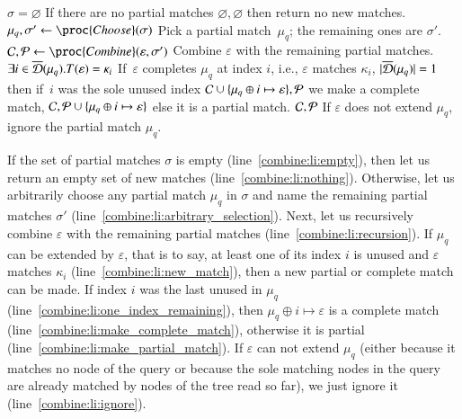 \begin{codebox}
\li	\If \(\sigma = \varnothing\)
\label{combine:li:empty}
\RComment If there are no partial matches
\li	\Then \Return \(\varnothing, \varnothing\)
\label{combine:li:nothing}
\RComment then return no new matches.
	\End
\li	\(\mu_q, \sigma' \gets \proc{Choose} (\sigma)\)
\label{combine:li:arbitrary_selection}
\RComment Pick a partial match~\(\mu_q\); the remaining ones are \(\sigma'\).
\li \({\cal C}, {\cal P} \gets 
      \proc{Combine} (\varepsilon, \sigma')\)
\label{combine:li:recursion}
\RComment Combine \(\varepsilon\) with the remaining partial matches.
\li	\If \(\exists i \in \overline{\cal D}(\mu_q).T(\varepsilon) = \kappa_i\)
\label{combine:li:new_match}
\RComment If~\(\varepsilon\) completes \(\mu_q\) at index \(i\),
i.e., \(\varepsilon\) matches \(\kappa_i\),
\li	\Then \If \(|\overline{\cal D}(\mu_q)| = 1\)
\label{combine:li:one_index_remaining}
\RComment then if~\(i\) was the sole unused index
\li       \Then \Return \({\cal C} \cup \{\mu_q \oplus i \mapsto
                          \varepsilon\}, {\cal P}\)
\label{combine:li:make_complete_match}
\RComment we make a complete match,
          \End
\li       \Return \({\cal C}, 
                     {\cal P} \cup \{\mu_q \oplus i \mapsto
                     \varepsilon\}\)
\label{combine:li:make_partial_match}
\RComment else it is a partial match.
\End
\li\Return \({\cal C}, {\cal P}\)
\label{combine:li:ignore}
\RComment If \(\varepsilon\) does not extend \(\mu_q\), ignore the
partial match \(\mu_q\).
\end{codebox}
If the set of partial matches \(\sigma\) is empty
(line~\ref{combine:li:empty}), then let us return an empty set of new
matches (line~\ref{combine:li:nothing}). Otherwise, let us arbitrarily
choose any partial match \(\mu_q\) in \(\sigma\) and name the
remaining partial matches \(\sigma'\)
(line~\ref{combine:li:arbitrary_selection}). Next, let us recursively
combine \(\varepsilon\) with the remaining partial matches
(line~\ref{combine:li:recursion}). If \(\mu_q\) can be extended by
\(\varepsilon\), that is to say, at least one of its index \(i\) is
unused and \(\varepsilon\) matches \(\kappa_i\)
(line~\ref{combine:li:new_match}), then a new partial or complete
match can be made. If index \(i\) was the last unused in \(\mu_q\)
(line~\ref{combine:li:one_index_remaining}), then \(\mu_q \oplus i
\mapsto \varepsilon\) is a complete match
(line~\ref{combine:li:make_complete_match}), otherwise it is partial
(line~\ref{combine:li:make_partial_match}). If \(\varepsilon\) can not
extend \(\mu_q\) (either because it matches no node of the query or
because the sole matching nodes in the query are already matched by
nodes of the \XML tree read so far), we just ignore it
(line~\ref{combine:li:ignore}).


